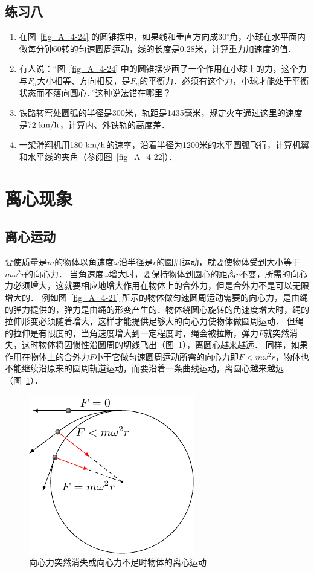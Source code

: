 \subsection*{练习八}
\begin{enumerate}
    \item 在图~\ref{fig_A_4-24} 的圆锥摆中，如果线和垂直方向成30$^\circ$角，小球在水平面内做每分钟60转的匀速圆周运动，线的长度是0.28米，计算重力加速度的值．
\item 有人说：“图~\ref{fig_A_4-24} 中的圆锥摆少画了一个作用在小球上的力，这个力与$F_n$大小相等、方向相反，是$F_n$的平衡力．必须有这个力，小球才能处于平衡状态而不落向圆心．”这种说法错在哪里？
\item 铁路转弯处圆弧的半径是300米，轨距是1435毫米，规定火车通过这里的速度是72$\;\text{km}/\text{h}$，计算内、外铁轨的高度差．
\item 一架滑翔机用180$\;\text{km}/\text{h}$的速率，沿着半径为1200米的水平圆弧飞行，计算机翼和水平线的夹角（参阅图~\ref{fig_A_4-22}）．
\end{enumerate}

\section{离心现象}
\subsection{离心运动} 

要使质量是$m$的物体以角速度$\omega$沿半径是$r$的圆周运动，就要使物体受到大小等于$m\omega^2r$的向心力．
当角速度$\omega$增大时，要保持物体到圆心的距离$r$不变，所需的向心力必须增大，这就要相应地增大作用在物体上的合外力，但是合外力不是可以无限增大的．
例如图~\ref{fig_A_4-21} 所示的物体做匀速圆周运动需要的向心力，是由绳的弹力提供的，弹力是由绳的形变产生的．物体绕圆心旋转的角速度增大时，绳的拉伸形变必须随着增大，这样才能提供足够大的向心力使物体做圆周运动．
但绳的拉伸是有限度的，当角速度增大到一定程度时，绳会被拉断，弹力$F$就突然消失，这时物体将因惯性沿圆周的切线飞出（图~\ref{fig_A_4-28}），离圆心越来越远．
同样，如果作用在物体上的合外力$F$小于它做匀速圆周运动所需的向心力即$F<m\omega^2 r$，物体也不能继续沿原来的圆周轨道运动，而要沿着一条曲线运动，离圆心越来越远（图~\ref{fig_A_4-28}）．
\begin{figure}[htbp]
    \centering
    \includegraphics{fig/A/4-28.pdf}
    \caption{向心力突然消失或向心力不足时物体的离心运动}\label{fig_A_4-28}
\end{figure}


